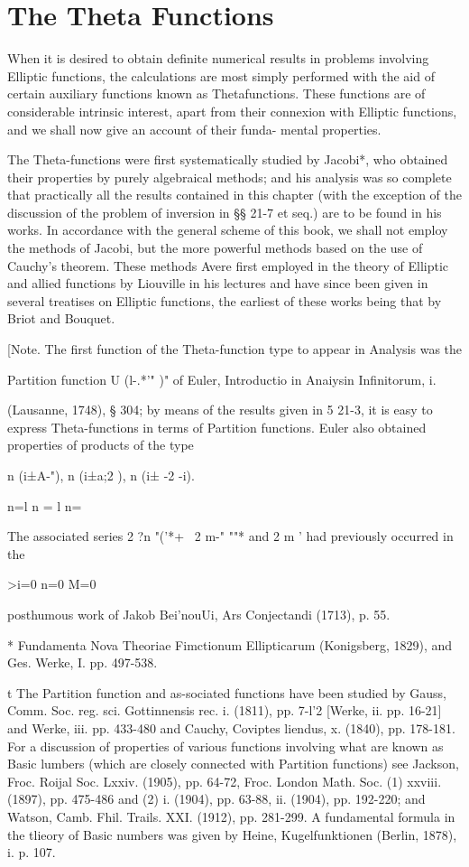 %
%
\chapter{The Theta Functions}


When it is desired to obtain definite numerical results in problems
involving Elliptic functions, the calculations are most simply
performed with the aid of certain auxiliary functions known as
Thetafunctions. These functions are of considerable intrinsic
interest, apart from their connexion with Elliptic functions, and we
shall now give an account of their funda- mental properties.

The Theta-functions were first systematically studied by Jacobi*, who
obtained their properties by purely algebraical methods; and his
analysis was so complete that practically all the results contained in
this chapter (with the exception of the discussion of the problem of
inversion in §§ 21-7 et seq.) are to be found in his works. In
accordance with the general scheme of this book, we shall not employ
the methods of Jacobi, but the more powerful methods based on the use
of Cauchy's theorem. These methods Avere first employed in the theory
of Elliptic and allied functions by Liouville in his lectures and have
since been given in several treatises on Elliptic functions, the
earliest of these works being that by Briot and Bouquet.

[Note. The first function of the Theta-function type to appear in
Analysis was the

Partition function U (l-.*'" )" of Euler, Introductio in Anaiysin
Infinitorum, i.

(Lausanne, 1748), § 304; by means of the results given in 5 21-3, it
is easy to express Theta-functions in terms of Partition functions.
Euler also obtained properties of products of the type

n (i±A-"), n (i±a;2 ), n (i± -2 -i).

n=l n = l n=\

The associated series 2 ?n "('*+ \ 2 m-" ""* and 2 m ' had previously
occurred in the

>i=0 n=0 M=0

posthumous work of Jakob Bei'nouUi, Ars Conjectandi (1713), p. 55.

* Fundamenta Nova Theoriae Fimctionum Ellipticarum (Konigsberg, 1829),
and Ges. Werke, I. pp. 497-538.

t The Partition function and as-sociated functions have been studied
by Gauss, Comm. Soc. reg. sci. Gottinnensis rec. i. (1811), pp. 7-l'2
[Werke, ii. pp. 16-21] and Werke, iii. pp. 433-480 and Cauchy,
Coviptes liendus, x. (1840), pp. 178-181. For a discussion of
properties of various functions involving what are known as Basic
lumbers (which are closely connected with Partition functions) see
Jackson, Froc. Roijal Soc. Lxxiv. (1905), pp. 64-72, Froc. London
Math. Soc. (1) xxviii. (1897), pp. 475-486 and (2) i. (1904), pp.
63-88, ii. (1904), pp. 192-220; and Watson, Camb. Fhil. Trails. XXI.
(1912), pp. 281-299. A fundamental formula in the tlieory of Basic
numbers was given by Heine, Kugelfunktionen (Berlin, 1878), i. p. 107.

